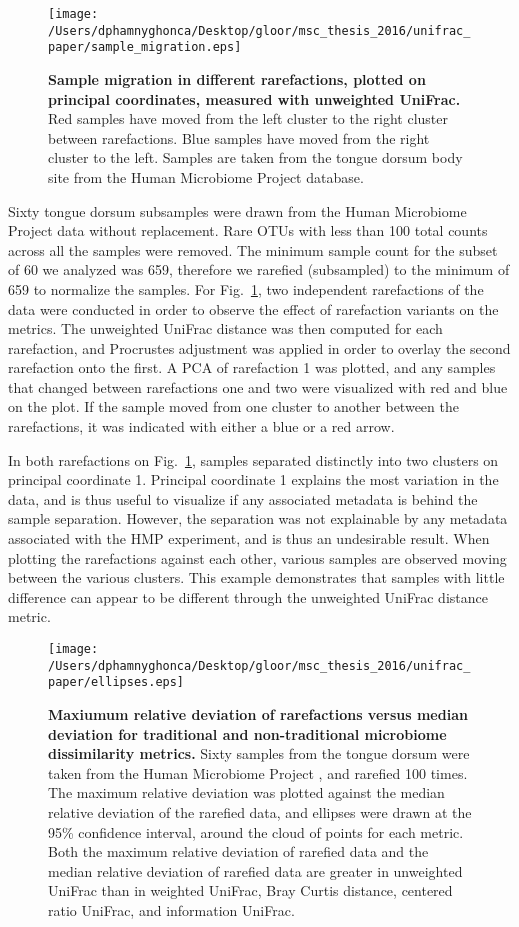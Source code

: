 \documentclass[10pt,letterpaper]{article}
\begin{document}
\begin{figure}[h]
\texttt{[image: /Users/dphamnyghonca/Desktop/gloor/msc\_thesis\_2016/unifrac\_paper/sample\_migration.eps]}
\caption{{\bf Sample migration in different rarefactions, plotted on principal coordinates, measured with unweighted UniFrac.}
Red samples have moved from the left cluster to the right cluster between rarefactions. Blue samples have moved from the right cluster to the left. Samples are taken from the tongue dorsum body site from the Human Microbiome Project database.}
\label{fig2}
\end{figure}

Sixty tongue dorsum subsamples were drawn from the Human Microbiome Project data without replacement. Rare OTUs with less than 100 total counts across all the samples were removed. The minimum sample count for the subset of 60 we analyzed was 659, therefore we rarefied (subsampled) to the minimum of 659 to normalize the samples. For Fig.~\ref{fig2}, two independent rarefactions of the data were conducted in order to observe the effect of rarefaction variants on the metrics. The unweighted UniFrac distance was then computed for each rarefaction, and Procrustes adjustment was applied in order to overlay the second rarefaction onto the first. A PCA of rarefaction 1 was plotted, and any samples that changed between rarefactions one and two were visualized with red and blue on the plot. If the sample moved from one cluster to another between the rarefactions, it was indicated with either a blue or a red arrow. 

In both rarefactions on Fig.~\ref{fig2}, samples separated distinctly into two clusters on principal coordinate 1. Principal coordinate 1 explains the most variation in the data, and is thus useful to visualize if any associated metadata is behind the sample separation. However, the separation was not explainable by any metadata associated with the HMP experiment, and is thus an undesirable result. When plotting the rarefactions against each other, various samples are observed moving between the various clusters. This example demonstrates that samples with little difference can appear to be different through the unweighted UniFrac distance metric.

\begin{figure}[h]
\texttt{[image: /Users/dphamnyghonca/Desktop/gloor/msc\_thesis\_2016/unifrac\_paper/ellipses.eps]}
\caption{{\bf Maxiumum relative deviation of rarefactions versus median deviation for traditional and non-traditional microbiome dissimilarity metrics.} Sixty samples from the tongue dorsum were taken from the Human Microbiome Project \cite{turnbaugh2007human}, and rarefied 100 times. The maximum relative deviation was plotted against the median relative deviation of the rarefied data, and ellipses were drawn at the 95\% confidence interval, around the cloud of points for each metric. Both the maximum relative deviation of rarefied data and the median relative deviation of rarefied data are greater in unweighted UniFrac than in weighted UniFrac, Bray Curtis distance, centered ratio UniFrac, and information UniFrac.}
\label{fig3}
\end{figure}
\end{document}
